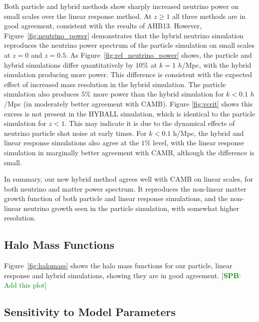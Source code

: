 \documentclass[useAMS, usenatbib]{mnras}
\newcommand{\spb}[1]{{\textcolor{green}{[{\bf SPB}: #1]}}}
\begin{document}
Both particle and hybrid methods show sharply increased neutrino power on small scales over the linear response method. At $z \geq 1$ all three methods are in good agreement, consistent with the results of AHB13. However, Figure~\ref{fig:neutrino_power} demonstrates that the hybrid neutrino simulation reproduces the neutrino power spectrum of the particle simulation on small scales at $z = 0$ and $z=0.5$. As Figure~\ref{fig:rel_neutrino_power} shows, the particle and hybrid simulations differ quantitatively by $10\%$ at $k=1$ $h$/Mpc, with the hybrid simulation producing more power. This difference is consistent with the expected effect of increased mass resolution in the hybrid simulation. The particle simulation also produces $5\%$ more power than the hybrid simulation for $k < 0.1$ $h$/Mpc (in moderately better agreement with CAMB). Figure \ref{fig:vcrit} shows this excess is not present in the HYBALL simulation, which is identical to the particle simulation for $z < 1$. This may indicate it is due to the dynamical effects of neutrino particle shot noise at early times. For $k < 0.1$ h/Mpc, the hybrid and linear response simulations also agree at the $1\%$ level, with the linear response simulation in marginally better agreement with CAMB, although the difference is small.

In summary, our new hybrid method agrees well with CAMB on linear scales, for both neutrino and matter power spectrum. It reproduces the non-linear matter growth function of both particle and linear response simulations, and the non-linear neutrino growth seen in the particle simulation, with somewhat higher resolution.

\subsection{Halo Mass Functions}
\label{sec:halomass}

Figure~\ref{fig:halomass} shows the halo mass functions for our particle, linear response and hybrid simulations, showing they are in good agreement. \spb{Add this plot}

\subsection{Sensitivity to Model Parameters}
\label{sec:check}
\end{document}
